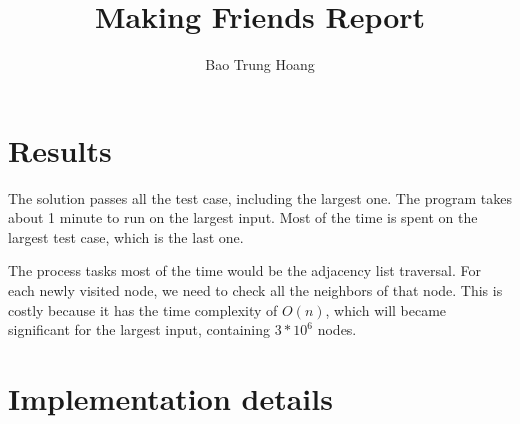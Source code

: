\documentclass{article}
\title{Making Friends Report}
\author{Bao Trung Hoang}
\begin{document}
  \maketitle

  \section{Results}


  The solution passes all the test case, including the largest one.
  The program takes about 1 minute to run on the largest input. 
  Most of the time is spent on the largest test case, which is the last one. 
  

  The process tasks most of the time would be the adjacency list traversal.
  For each newly visited node, we need to check all the neighbors of that node.
  This is costly because it has the time complexity of $O(n)$, which will became 
  significant for the largest input, containing $3 * 10^6$ nodes.

  \section{Implementation details}

\end{document}
